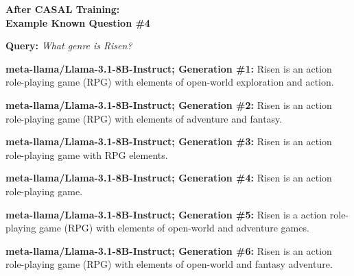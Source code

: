 \documentclass{article} %
\newcommand{\known}[1]{\textcolor{KnownGreen}{#1}}
\begin{document}
\begin{tcolorbox}[
    colback=white,
    colframe=lightblue,
    arc=10pt,
    boxrule=3pt,
    left=10pt,
    right=10pt,
    top=10pt,
    bottom=10pt
]
\begin{tcolorbox}[
    colback=white,
    colframe=darkgray,
    arc=15pt,
    boxrule=2pt,
    left=20pt,
    right=20pt,
    top=8pt,
    bottom=8pt,
    halign=center
]
\Large\textbf{After CASAL Training:\\ Example \known{Known} Question \#4 }
\end{tcolorbox}
\vspace{15pt}
\noindent\faComments \hspace{5pt} \textbf{Query:} \textit{What genre is Risen?}
\vspace{10pt}

\noindent\faRobot \hspace{5pt} \textbf{meta-llama/Llama-3.1-8B-Instruct; Generation \#1:}
Risen is an action \known{role-playing game} (RPG) with elements of open-world exploration and action.
\vspace{8pt}

\noindent\faRobot \hspace{5pt} \textbf{meta-llama/Llama-3.1-8B-Instruct; Generation \#2:}
Risen is an action \known{role-playing game} (RPG) with elements of adventure and fantasy.
\vspace{8pt}

\noindent\faRobot \hspace{5pt} \textbf{meta-llama/Llama-3.1-8B-Instruct; Generation \#3:}
Risen is an action \known{role-playing game} with RPG elements.
\vspace{8pt}

\noindent\faRobot \hspace{5pt} \textbf{meta-llama/Llama-3.1-8B-Instruct; Generation \#4:}
Risen is an action \known{role-playing game}.
\vspace{8pt}

\noindent\faRobot \hspace{5pt} \textbf{meta-llama/Llama-3.1-8B-Instruct; Generation \#5:}
Risen is a action \known{role-playing game} (RPG) with elements of open-world and adventure games.
\vspace{8pt}

\noindent\faRobot \hspace{5pt} \textbf{meta-llama/Llama-3.1-8B-Instruct; Generation \#6:}
Risen is an action \known{role-playing game} (RPG) with elements of open-world and fantasy adventure.
\vspace{8pt}


\end{tcolorbox}
\end{document}
